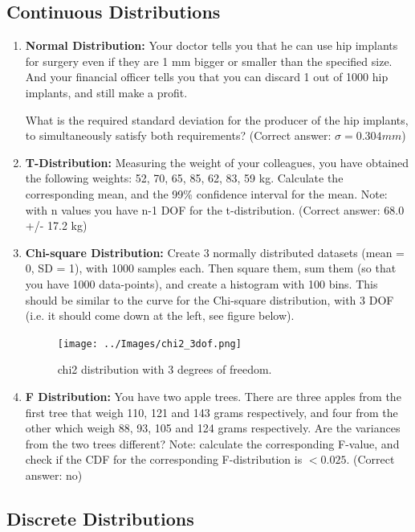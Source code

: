 \subsection*{Continuous Distributions }
\begin{enumerate}
    \item \textbf{Normal Distribution:} Your doctor tells you that he can use hip implants for surgery even if they are 1 mm bigger or smaller than the specified size. And your financial officer tells you that you can discard 1 out of 1000 hip implants, and still make a profit.

        What is the required standard deviation for the producer of the hip implants, to simultaneously satisfy both requirements?
        (Correct answer: $\sigma=0.304 mm$)
    \item \textbf{T-Distribution:} Measuring the weight of your colleagues, you have obtained the following weights: 52, 70, 65, 85, 62, 83, 59 kg.
    Calculate the corresponding mean, and the 99\% confidence interval for the mean. Note: with n values you have n-1 DOF for the t-distribution.
    (Correct answer: 68.0 +/- 17.2 kg)

    \item \textbf{Chi-square Distribution:} Create 3 normally distributed datasets (mean = 0, SD = 1), with 1000 samples each. Then square them, sum them (so that you have 1000 data-points), and create a histogram with 100 bins. This should be similar to the curve for the Chi-square distribution, with 3 DOF (i.e. it should come down at the left, see figure below).
    \begin{figure}
      \centering
      \texttt{[image: ../Images/chi2\_3dof.png]}\\
      \caption{chi2 distribution with 3 degrees of freedom.}\label{fig:chi23dof}
    \end{figure}

    \item \textbf{F Distribution:} You have two apple trees. There are three apples from the first tree that weigh 110, 121 and 143 grams respectively, and four from the other which weigh 88, 93, 105 and 124 grams respectively. Are the variances from the two trees different?
    Note: calculate the corresponding F-value, and check if the CDF for the corresponding F-distribution is $<0.025$.
    (Correct answer: no)
\end{enumerate}
\subsection*{Discrete Distributions }

